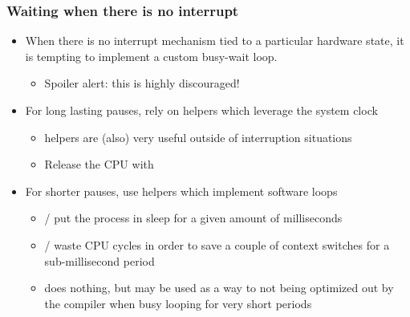 \begin{frame}[fragile]
  \frametitle{Waiting when there is no interrupt}
  \begin{itemize}
  \item When there is no interrupt mechanism tied to a particular
        hardware state, it is tempting to implement a custom busy-wait loop.
    \begin{itemize}
    \item Spoiler alert: this is highly discouraged!
    \end{itemize}
  \item For long lasting pauses, rely on helpers which leverage the
    system clock
    \begin{itemize}
    \item {} helpers are (also) very useful outside of
      interruption situations
    \item Release the CPU with 
    \end{itemize}
  \item For shorter pauses, use helpers which implement software loops
    \begin{itemize}
    \item {}/ put the process
      in sleep for a given amount of milliseconds
    \item {}/ waste CPU cycles in order
      to save a couple of context switches for a sub-millisecond period
    \item {} does nothing, but may be used as a way to
      not being optimized out by the compiler when busy looping for very
      short periods
    \end{itemize}
  \end{itemize}
\end{frame}

